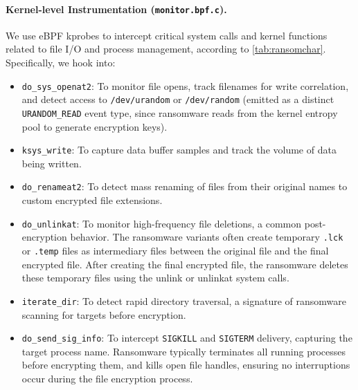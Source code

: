\documentclass[twocolumn, 10pt]{scrartcl}
\begin{document}
\paragraph{Kernel-level Instrumentation (\texttt{monitor.bpf.c}).} 
We use eBPF kprobes to intercept critical system calls and kernel functions related to file I/O and process management, according to \cref{tab:ransomchar}. Specifically, we hook into:
\begin{itemize}
    \item \texttt{do\_sys\_openat2}: To monitor file opens, track filenames for write correlation, and detect access to \texttt{/dev/urandom} or \texttt{/dev/random} (emitted as a distinct \texttt{URANDOM\_READ} event type, since ransomware reads from the kernel entropy pool to generate encryption keys).
    \item \texttt{ksys\_write}: To capture data buffer samples and track the volume of data being written.
    \item \texttt{do\_renameat2}: To detect mass renaming of files from their original names to custom encrypted file extensions.
    \item \texttt{do\_unlinkat}: To monitor high-frequency file deletions, a common post-encryption behavior. The ransomware variants often create temporary \texttt{.lck} or \texttt{.temp} files as intermediary files between the original file and the final encrypted file. After creating the final encrypted file, the ransomware deletes these temporary files using the unlink or unlinkat system calls.
    \item \texttt{iterate\_dir}: To detect rapid directory traversal, a signature of ransomware scanning for targets before encryption.
    \item \texttt{do\_send\_sig\_info}: To intercept \texttt{SIGKILL} and \texttt{SIGTERM} delivery, capturing the target process name. Ransomware typically terminates all running processes before encrypting them, and kills open file handles, ensuring no interruptions occur during the file encryption process.
\end{itemize}
\end{document}
